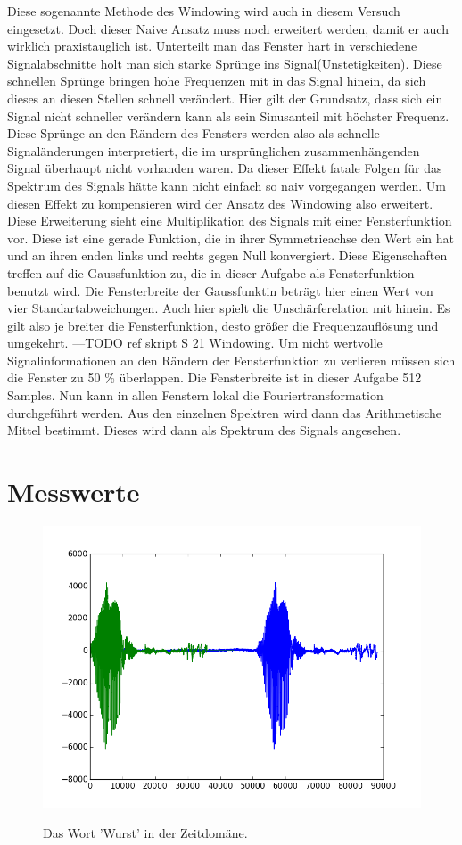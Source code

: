 Diese sogenannte Methode des Windowing wird auch in diesem Versuch eingesetzt. Doch dieser Naive Ansatz muss noch erweitert werden, damit er auch wirklich praxistauglich ist. Unterteilt man das Fenster hart in verschiedene Signalabschnitte holt man sich starke Sprünge ins Signal(Unstetigkeiten). Diese schnellen Sprünge bringen hohe Frequenzen mit in das Signal hinein, da sich dieses an diesen Stellen schnell verändert. Hier gilt der Grundsatz, dass sich ein Signal nicht schneller verändern kann als sein Sinusanteil mit höchster Frequenz.
Diese Sprünge an den Rändern des Fensters werden also als schnelle Signaländerungen interpretiert, die im ursprünglichen zusammenhängenden Signal überhaupt nicht vorhanden waren.
Da dieser Effekt fatale Folgen für das Spektrum des Signals hätte kann nicht einfach so naiv vorgegangen werden.
Um diesen Effekt zu kompensieren wird der Ansatz des Windowing also erweitert. Diese Erweiterung sieht eine Multiplikation des Signals mit einer Fensterfunktion vor. Diese ist eine gerade Funktion, die in ihrer Symmetrieachse den Wert ein hat und an ihren enden links und rechts gegen Null konvergiert. Diese Eigenschaften treffen auf die Gaussfunktion zu, die in dieser Aufgabe als Fensterfunktion benutzt wird. Die Fensterbreite der Gaussfunktin beträgt hier einen Wert von vier Standartabweichungen.
Auch hier spielt die Unschärferelation mit hinein. Es gilt also je breiter die Fensterfunktion, desto größer die Frequenzauflösung und umgekehrt. ---TODO ref skript S 21 Windowing. Um nicht wertvolle Signalinformationen an den Rändern der Fensterfunktion zu verlieren müssen sich die Fenster zu 50 \% überlappen. Die Fensterbreite ist in dieser Aufgabe 512 Samples. 
Nun kann in allen Fenstern lokal die Fouriertransformation durchgeführt werden. Aus den einzelnen Spektren wird dann das Arithmetische Mittel bestimmt. Dieses wird dann als Spektrum des Signals angesehen.

\newpage
\section{Messwerte}
\label{chap:VERSUCH_1_MESSWERTE}
\begin{figure}[H]
\includegraphics[width=\textwidth]{media/triggertest.png}
\label{fig:Wurst_Triggered}
\caption{Das Wort 'Wurst' in der Zeitdomäne.}
\end{figure}

